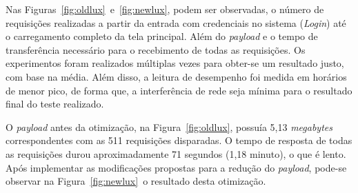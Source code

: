 \begin{figure}[th]
\end{figure}

Nas Figuras~\ref{fig:oldlux}~e~\ref{fig:newlux}, podem ser observadas, o número de requisições realizadas a partir da entrada com credenciais no sistema (\textit{Login}) até o carregamento completo da tela principal. Além do \textit{payload} e o tempo de transferência necessário para o recebimento de todas as requisições. Os experimentos foram realizados múltiplas vezes para obter-se um resultado justo, com base na média. Além disso, a leitura de desempenho foi medida em horários de menor pico, de forma que, a interferência de rede seja mínima para o resultado final do teste realizado.

O \textit{payload} antes da otimização, na Figura~\ref{fig:oldlux}, possuía 5,13 \textit{megabytes} correspondentes com as 511 requisições disparadas. O tempo de resposta de todas as requisições durou aproximadamente 71 segundos (1,18 minuto), o que é lento. Após implementar as modificações propostas para a redução do \textit{payload}, pode-se observar na Figura~\ref{fig:newlux}~o resultado desta otimização.

\begin{figure}[th]
\end{figure}

